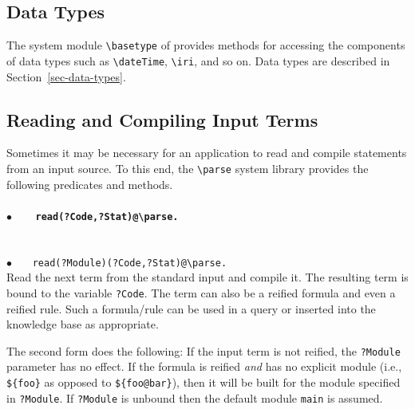 \documentclass[11pt]{article}
\newcommand{\ERGO}{\mbox{\smaller{\ensuremath{\cal{E}}\smaller{{\sc{RGO}}}}}\xspace}
\newcommand{\FLSYSTEM}{\ERGO}
\newcommand{\bs}{\textbackslash}
\begin{document}
\subsection{Data Types}\label{sec-data-types-sysmod}

The system module \texttt{\bs{}basetype}   of \FLSYSTEM provides methods for accessing the components
of data types such as {\tt \bs{}dateTime}, {\tt \bs{}iri}, and so on.
Data types are described in Section~\ref{sec-data-types}.






\subsection{Reading and Compiling Input Terms}\label{sec-parse-compile}

Sometimes it may be necessary for an application to read and compile \FLSYSTEM
statements from an input source. To this end, the {\tt \bs{}parse} 
system library provides the following predicates and methods.
\paragraph{$\bullet$~~~ \tt  read(?Code,?Stat)@\bs{}parse.} ~~\\
{$\bullet$~~~ \tt  read(?Module)(?Code,?Stat)@\bs{}parse.} ~~\\
Read the next term from the standard input and compile it. The resulting
term is bound to the variable {\tt ?Code}.  The term can also be a reified
formula and even a reified rule.  Such a formula/rule can be used in a
query or inserted into the knowledge base as appropriate.

\noindent
The second form does the following:
If the input term
is not reified, the {\tt ?Module} parameter has no effect. If the formula is
reified \emph{and} has no explicit module (i.e., \texttt{\$\{foo\}} as
opposed to \texttt{\$\{foo@bar\}}), then it will be built for the module specified in {\tt ?Module}. If
{\tt ?Module} is unbound then the default module {\tt main} is assumed.
\end{document}
